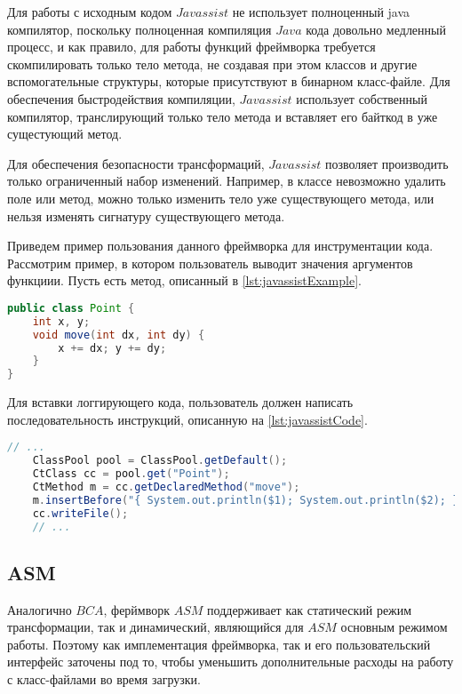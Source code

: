 Для работы с исходным кодом $Javassist$ не использует полноценный java компилятор, поскольку полноценная компиляция $Java$ кода довольно медленный процесс, и как правило, для работы функций фреймворка требуется скомпилировать только тело метода, не создавая при этом классов и другие вспомогательные структуры, которые присутствуют в бинарном класс-файле. Для обеспечения быстродействия компиляции, $Javassist$ использует собственный компилятор, транслирующий только тело метода и вставляет его байткод в уже сущестующий метод.

Для обеспечения безопасности трансформаций, $Javassist$ позволяет производить только ограниченный набор изменений. Например, в классе невозможно удалить поле или метод, можно только изменить тело уже существующего метода, или нельзя изменять сигнатуру существующего метода.

Приведем пример пользования данного фреймворка для инструментации кода. Рассмотрим пример, в котором пользователь выводит значения аргументов функциии. Пусть есть метод, описанный в \autoref{lst:javassistExample}.

\begin{lstlisting}[language=Java, caption=Исходный класс, label=lst:javassistExample]
public class Point {
    int x, y;
    void move(int dx, int dy) {
        x += dx; y += dy;
    }
}
\end{lstlisting}

Для вставки логгирующего кода, пользователь должен написать последовательность инструкций, описанную на \autoref{lst:javassistCode}.


\begin{lstlisting}[language=Java, caption=Исходный класс, label=lst:javassistExample]
    // ...
    ClassPool pool = ClassPool.getDefault();
    CtClass cc = pool.get("Point");
    CtMethod m = cc.getDeclaredMethod("move");
    m.insertBefore("{ System.out.println($1); System.out.println($2); }");
    cc.writeFile();
    // ...
\end{lstlisting}

\subsection{ASM}

Аналогично $BCA$, ферймворк $ASM$ \cite{asm} поддерживает как статический режим трансформации, так и динамический, являющийся для $ASM$ основным режимом работы. Поэтому как имплементация фреймворка, так и его пользовательский интерфейс заточены под то, чтобы уменьшить дополнительные расходы на работу с класс-файлами во время загрузки.

